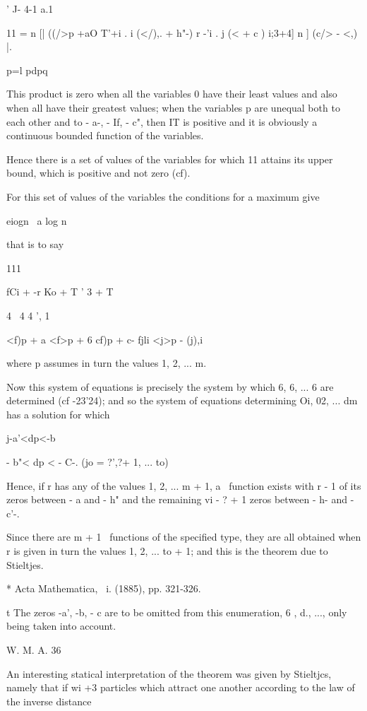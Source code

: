 {{{{{{{ ' J- 4-1 a.1

11 = n [| ((/>p +aO T'+i . i (</),. + h"-) r -'i . j (< + c ) i;3+4] n
] (c/> - <,) |.

p=l pdpq

This product is zero when all the variables 0 have their least values
and also when all have their greatest values; when the variables p
are unequal both to each other and to - a-, - If, - c", then IT is
positive and it is obviously a continuous bounded function of the
variables.

Hence there is a set of values of the variables for which 11 attains
its upper bound, which is positive and not zero (cf).

For this set of values of the variables the conditions for a maximum
give

eiogn \ a log n \

that is to say

111

fCi + -r Ko + T ' 3 + T

4 \ 4 4 ', 1 \

<f)p + a <f>p + 6 cf)p + c- fjli <j>p - (j),i

where p assumes in turn the values 1, 2, ... m.

Now this system of equations is precisely the system by which 6, 6,
... 6 are determined (cf -23'24); and so the system of
equations determining Oi, 02, ... dm has a solution for which

j-a'<dp<-b%

 - b"< dp < - C-. (jo = ?',?+ 1, ... to)

Hence, if r has any of the values 1, 2, ... m + 1, a \Lame\ function
exists with r - 1 of its zeros between - a and - h" and the remaining
vi - ? + 1 zeros between - h- and - c'-.

Since there are m + 1 \Lame\ functions of the specified type, they are
all obtained when r is given in turn the values 1, 2, ... to + 1; and
this is the theorem due to Stieltjes.

* Acta Mathematica, \ i. (1885), pp. 321-326.

t The zeros -a', -b, - c are to be omitted from this enumeration, 6
, d., ..., only being taken into account.

W. M. A. 36

%
%

An interesting statical interpretation of the theorem was given by
Stieltjcs, namely that if wi +3 particles which attract one another
according to the law of the inverse distance

}}}}}}}
